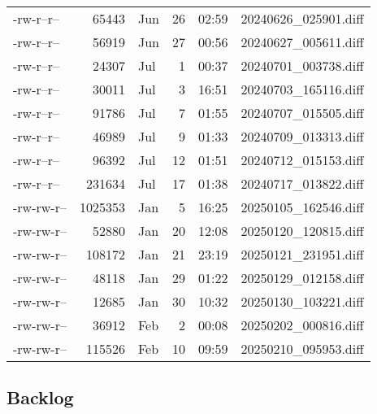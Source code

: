 \documentclass[a4paper]{article}
\begin{document}
\begin{longtable}{lrlrrl}
-rw-r--r-- & 65443 & Jun & 26 & 02:59 & 20240626\_025901.diff\\[0pt]
-rw-r--r-- & 56919 & Jun & 27 & 00:56 & 20240627\_005611.diff\\[0pt]
-rw-r--r-- & 24307 & Jul & 1 & 00:37 & 20240701\_003738.diff\\[0pt]
-rw-r--r-- & 30011 & Jul & 3 & 16:51 & 20240703\_165116.diff\\[0pt]
-rw-r--r-- & 91786 & Jul & 7 & 01:55 & 20240707\_015505.diff\\[0pt]
-rw-r--r-- & 46989 & Jul & 9 & 01:33 & 20240709\_013313.diff\\[0pt]
-rw-r--r-- & 96392 & Jul & 12 & 01:51 & 20240712\_015153.diff\\[0pt]
-rw-r--r-- & 231634 & Jul & 17 & 01:38 & 20240717\_013822.diff\\[0pt]
-rw-rw-r-- & 1025353 & Jan & 5 & 16:25 & 20250105\_162546.diff\\[0pt]
-rw-rw-r-- & 52880 & Jan & 20 & 12:08 & 20250120\_120815.diff\\[0pt]
-rw-rw-r-- & 108172 & Jan & 21 & 23:19 & 20250121\_231951.diff\\[0pt]
-rw-rw-r-- & 48118 & Jan & 29 & 01:22 & 20250129\_012158.diff\\[0pt]
-rw-rw-r-- & 12685 & Jan & 30 & 10:32 & 20250130\_103221.diff\\[0pt]
-rw-rw-r-- & 36912 & Feb & 2 & 00:08 & 20250202\_000816.diff\\[0pt]
-rw-rw-r-- & 115526 & Feb & 10 & 09:59 & 20250210\_095953.diff\\[0pt]
\end{longtable}


\subsection{Backlog}
\label{sec:org66255ab}
\end{document}
